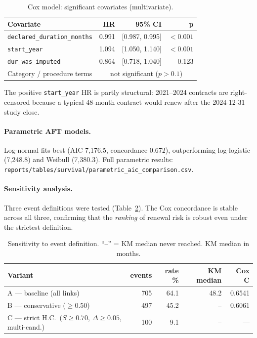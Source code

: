 \documentclass[11pt,a4paper]{article}
\begin{document}
\begin{table}[H]
\centering
\caption{Cox model: significant covariates (multivariate).}
\label{tab:cox}
\small
\begin{tabular}{@{}lrrr@{}}
\toprule
\textbf{Covariate} & \textbf{HR} & \textbf{95\% CI} & \textbf{p} \\
\midrule
\texttt{declared\_duration\_months} & 0.991 & [0.987, 0.995] & $<0.001$ \\
\texttt{start\_year}                & 1.094 & [1.050, 1.140] & $<0.001$ \\
\texttt{dur\_was\_imputed}          & 0.864 & [0.718, 1.040] & 0.123 \\
Category / procedure terms          & \multicolumn{3}{c}{not significant ($p>0.1$)} \\
\bottomrule
\end{tabular}
\end{table}

The positive \texttt{start\_year} HR is partly structural: 2021--2024 contracts
are right-censored because a typical 48-month contract would renew after the
2024-12-31 study close.

\paragraph{Parametric AFT models.} Log-normal fits best (AIC 7,176.5,
concordance 0.672), outperforming log-logistic (7,248.8) and Weibull (7,380.3).
Full parametric results: \nolinkurl{reports/tables/survival/parametric_aic_comparison.csv}.

\paragraph{Sensitivity analysis.} Three event definitions were tested
(Table~\ref{tab:sens}). The Cox concordance is stable across all three,
confirming that the \emph{ranking} of renewal risk is robust even under the
strictest definition.

\begin{table}[H]
\centering
\caption{Sensitivity to event definition. ``--'' = KM median never reached. KM median in months.}
\label{tab:sens}
\small
\begin{tabular}{@{}lrrrr@{}}
\toprule
\textbf{Variant} & \textbf{events} & \textbf{rate \%} & \textbf{KM median} & \textbf{Cox C} \\
\midrule
A --- baseline (all links)            & 705 & 64.1 & 48.2 & 0.6541 \\
B --- conservative ($\geq 0.50$)      & 497 & 45.2 & --   & 0.6061 \\
C --- strict H.C.\ ($S\!\geq\!0.70$, $\Delta\!\geq\!0.05$, multi-cand.) & 100 & 9.1 & -- & --- \\
\bottomrule
\end{tabular}
\end{table}
\end{document}
